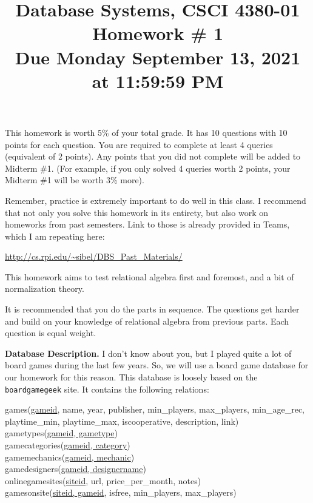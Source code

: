 \documentclass[11pt]{article}
\title{Database Systems, CSCI 4380-01 \\
Homework \# 1 \\
Due Monday September 13, 2021 at 11:59:59 PM}
\date{}
\begin{document}
\maketitle

\vspace*{-0.7in}

 This homework is worth 5\% of your
total grade. It has 10 questions with 10 points for each question. You
are required to complete at least 4 queries (equivalent of 2
points). Any points that you did not complete will be added to Midterm
\#1. (For example, if you only solved 4 queries worth 2 points, your
Midterm \#1 will be worth 3\% more).

Remember, practice is extremely important to do well in this class. I
recommend that not only you solve this homework in its entirety, but
also work on homeworks from past semesters. Link to those is already
provided in Teams, which I am repeating here:

\url{http://cs.rpi.edu/~sibel/DBS_Past_Materials/}

This homework aims to test relational algebra first and foremost, and
a bit of normalization theory.

It is recommended that you do the parts in sequence. The questions get
harder and build on your knowledge of relational algebra from previous
parts. Each question is equal weight.

{\bf Database Description.} I don't know about you, but I played quite
a lot of board games during the last few years. So, we will use a
board game database for our homework for this reason. This database is
loosely based on the {\tt boardgamegeek} site. It contains the
following relations:

games(\underline{gameid}, name, year, publisher, min\_players, max\_players, min\_age\_rec, playtime\_min, playtime\_max, iscooperative, description, link) \\
gametypes(\underline{gameid, gametype}) \\
gamecategories(\underline{gameid, category}) \\
gamemechanics(\underline{gameid, mechanic})  \\
gamedesigners(\underline{gameid, designername}) \\

onlinegamesites(\underline{siteid}, url, price\_per\_month, notes) \\
gamesonsite(\underline{siteid, gameid}, isfree, min\_players, max\_players) \\
\end{document}
